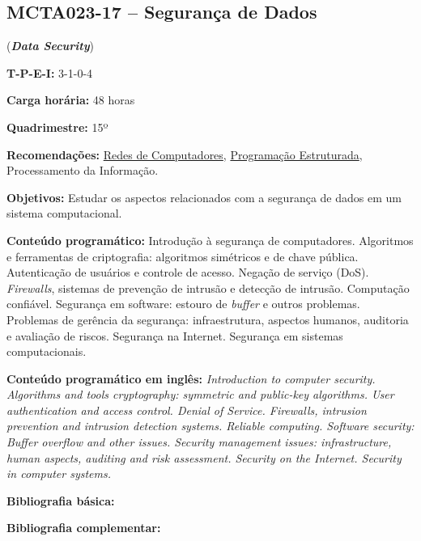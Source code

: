 \documentclass[12pt,a4paper]{article}
\begin{document}
\subsection*{MCTA023-17 -- Segurança de Dados}
\label{disc:seg}

(\textbf{\textit{Data Security}})

\begin{center}
    \begin{minipage}{0.85\textwidth}
    
        \textbf{T-P-E-I:} 3-1-0-4
        
        \textbf{Carga horária:} 48 horas
        
        \textbf{Quadrimestre:} 15º
        
        \textbf{Recomendações:} 
        \hyperref[disc:redes]{Redes de Computadores},
        \hyperref[disc:pe]{Programação Estruturada},
        Processamento da Informação.        
    \end{minipage}
\end{center}

\textbf{Objetivos:}
Estudar os aspectos relacionados com a segurança de dados em um sistema
computacional.

\textbf{Conteúdo programático:}
Introdução à segurança de computadores.
Algoritmos e ferramentas de criptografia: algoritmos simétricos e de chave pública.
Autenticação de usuários e controle de acesso.
Negação de serviço (DoS).
\textit{Firewalls}, sistemas de prevenção de intrusão e detecção de intrusão.
Computação confiável.
Segurança em software: estouro de \textit{buffer} e outros problemas.
Problemas de gerência da segurança: infraestrutura, aspectos humanos, auditoria
e avaliação de riscos. 
Segurança na Internet. Segurança em sistemas computacionais.

\textbf{Conteúdo programático em inglês:}
\textit{Introduction to computer security. 
Algorithms and tools cryptography: symmetric and public-key algorithms. 
User authentication and access control.
Denial of Service. 
Firewalls, intrusion prevention and intrusion detection systems. 
Reliable computing. 
Software security: Buffer overflow and other issues. 
Security management issues: infrastructure, human aspects, auditing and risk assessment. 
Security on the Internet. Security in computer systems.}

\newrefsection
\textbf{Bibliografia básica:}
\nocite{katz, 2008-stallings, 2007-nakamura-geus} 
\printbibliography

\newrefsection
\textbf{Bibliografia complementar:}
\nocite{2007-konheim, 1996-schneier, 2011-stamp, 2017-correia-sousa, 2005-cheswick-etal}
\printbibliography
\end{document}
